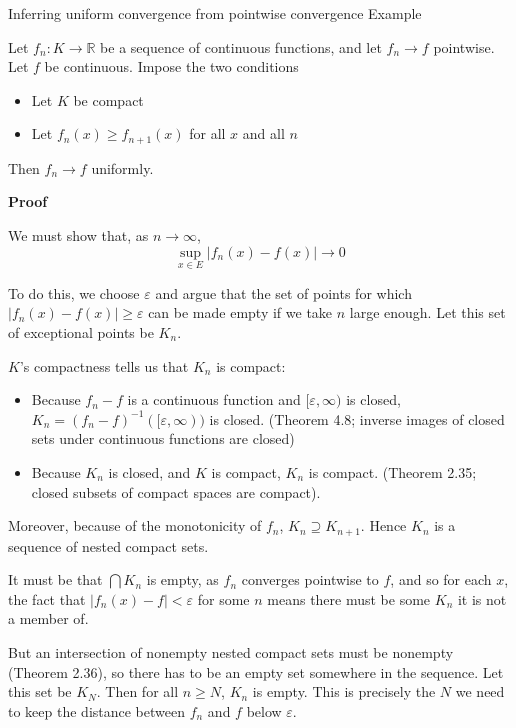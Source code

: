 \begin{result}
    {Inferring uniform convergence from pointwise convergence}
    {Example}
    
    Let $f_n: K \rightarrow \mathbb{R}$ be a sequence of continuous functions, and let $f_n \rightarrow f$ pointwise. Let $f$ be continuous. Impose the two conditions
    \begin{itemize}
        \item Let $K$ be compact
        \item Let $f_n(x) \geq f_{n+1}(x)$ for all $x$ and all $n$
    \end{itemize}
    Then $f_n \rightarrow f$ uniformly.

    \textbf{Proof}

    We must show that, as $n \rightarrow \infty$,
    \[\sup_{x \in E}|f_n(x) - f(x)| \rightarrow 0\]

    To do this, we choose $\varepsilon$ and argue that the set of points for which $|f_n(x) - f(x)| \geq \varepsilon$ can be made empty if we take $n$ large enough. Let this set of exceptional points be $K_n$.


    $K$'s compactness tells us that $K_n$ is compact:
    \begin{itemize}
        \item Because $f_n - f$ is a continuous function and $[\varepsilon, \infty)$ is closed, $K_n = (f_n-f)^{-1}([\varepsilon, \infty))$ is closed. (Theorem 4.8; inverse images of closed sets under continuous functions are closed) 
        \item Because $K_n$ is closed, and $K$ is compact, $K_n$ is compact. (Theorem 2.35; closed subsets of compact spaces are compact).
    \end{itemize}

    Moreover, because of the monotonicity of $f_n$, $K_n \supseteq K_{n+1}$. Hence $K_n$ is a sequence of nested compact sets.

    It must be that $\bigcap K_n$ is empty, as $f_n$ converges pointwise to $f$, and so for each $x$, the fact that $|f_n(x) - f| < \varepsilon$ for some $n$ means there must be some $K_n$ it is not a member of.

    But an intersection of nonempty nested compact sets must be nonempty (Theorem 2.36), so there has to be an empty set somewhere in the sequence. Let this set be $K_N$. Then for all $n \geq N$, $K_n$ is empty. This is precisely the $N$ we need to keep the distance between $f_n$ and $f$ below $\varepsilon$.
\end{result}


